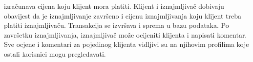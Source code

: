 izračunava cijena koju klijent mora platiti. Klijent i iznajmljivač dobivaju obavijest da je iznajmljivanje završeno i cijenu iznajmljivanja koju klijent treba platiti iznajmljivaču. Transakcija se izvršava i sprema u bazu podataka. Po završetku iznajmljivanja, iznajmljivač može ocijeniti klijenta i napisati komentar. Sve ocjene i komentari za pojedinog klijenta vidljivi su na njihovim profilima koje ostali korisnici mogu pregledavati. 
		
		
		
		
		
		
	